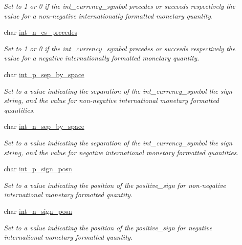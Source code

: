 \begin{DoxyCompactItemize}
\begin{DoxyCompactList}\small\item\em Set to 1 or 0 if the int\+\_\+currency\+\_\+symbol precedes or succeeds respectively the value for a non-\/negative internationally formatted monetary quantity. \end{DoxyCompactList}\item 
char \mbox{\hyperlink{structlconv_a36121c68c5571e40145365dd1edecbb7}{int\+\_\+n\+\_\+cs\+\_\+precedes}}
\begin{DoxyCompactList}\small\item\em Set to 1 or 0 if the int\+\_\+currency\+\_\+symbol precedes or succeeds respectively the value for a negative internationally formatted monetary quantity. \end{DoxyCompactList}\item 
char \mbox{\hyperlink{structlconv_ae77e798ef92e86d58100b16fb8163443}{int\+\_\+p\+\_\+sep\+\_\+by\+\_\+space}}
\begin{DoxyCompactList}\small\item\em Set to a value indicating the separation of the int\+\_\+currency\+\_\+symbol the sign string, and the value for non-\/negative international monetary formatted quantities. \end{DoxyCompactList}\item 
char \mbox{\hyperlink{structlconv_ad9cfa63e25f4a2aa02f6c7ca540177a2}{int\+\_\+n\+\_\+sep\+\_\+by\+\_\+space}}
\begin{DoxyCompactList}\small\item\em Set to a value indicating the separation of the int\+\_\+currency\+\_\+symbol the sign string, and the value for negative international monetary formatted quantities. \end{DoxyCompactList}\item 
char \mbox{\hyperlink{structlconv_a266ed42f4bb087d1efac551940c42f6f}{int\+\_\+p\+\_\+sign\+\_\+posn}}
\begin{DoxyCompactList}\small\item\em Set to a value indicating the position of the positive\+\_\+sign for non-\/negative international monetary formatted quantity. \end{DoxyCompactList}\item 
char \mbox{\hyperlink{structlconv_a642a9096f724fad40fe9f1711e92b323}{int\+\_\+n\+\_\+sign\+\_\+posn}}
\begin{DoxyCompactList}\small\item\em Set to a value indicating the position of the positive\+\_\+sign for negative international monetary formatted quantity. \end{DoxyCompactList}\end{DoxyCompactItemize}


